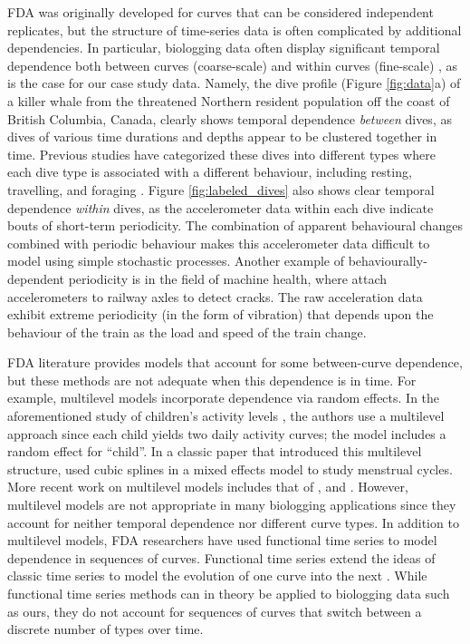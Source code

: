 FDA was originally developed for curves that can be considered independent replicates, but the structure of time-series data is often complicated by additional dependencies. In particular, biologging data often display significant temporal dependence both between curves (coarse-scale) and within curves (fine-scale) \citep{Barajas:2017,Adam:2019}, as is the case for our case study data. Namely, the dive profile (Figure \ref{fig:data}a) of a killer whale from the threatened Northern resident population off the coast of British Columbia, Canada, clearly shows temporal dependence \textit{between} dives, as dives of various time durations and depths appear to be clustered together in time. Previous studies have categorized these dives into different types where each dive type is associated with a different behaviour, including resting, travelling, and foraging \citep{Tennessen:2019b}.
Figure {\ref{fig:labeled_dives}} also shows clear temporal dependence \textit{within} dives, as the accelerometer data within each dive indicate bouts of short-term periodicity. The combination of apparent behavioural changes combined with periodic behaviour makes this accelerometer data difficult to model using simple stochastic processes. Another example of behaviourally-dependent periodicity is in the field of machine health, where \citet{Lucero:2019} attach accelerometers to railway axles to detect cracks. The raw acceleration data exhibit extreme periodicity (in the form of vibration) that depends upon the behaviour of the train as the load and speed of the train change.

FDA literature provides models that account for some between-curve dependence, but these methods are not adequate when this dependence is in time. For example, multilevel models incorporate dependence via random effects. In the aforementioned study of children's activity levels \citep{Morris:2007}, the authors use a multilevel approach since each child yields two daily activity curves; the model includes a random effect for ``child''. In a classic paper that introduced this multilevel structure,  \cite{Bromback:1998} used cubic splines in a mixed effects model to study menstrual cycles. More recent work on multilevel models includes that of \citet{Di:2009}, \citet{Chen:2012} and \citet{Crainiceanu:2009}. However, multilevel models are not appropriate in many biologging applications since they account for neither temporal dependence nor different curve types. 
In addition to multilevel models, FDA researchers have used functional time series to model dependence in sequences of curves. Functional time series extend the ideas of classic time series to model the evolution of one curve into the next \citep{Kokoszka:2018}. While functional time series methods can in theory be applied to biologging data such as ours, they do not account for sequences of curves that switch between a discrete number of types over time.
 
